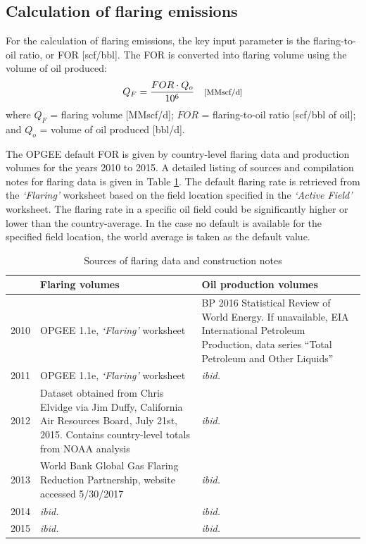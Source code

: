 \documentclass[11pt]{report}
\newcommand{\marg}[1]{{\footnotesize\textit{\textcolor{stanford}{'#1'}}}}
\newcommand{\marginnote}[1]{\marginpar{\marg{#1}}}
\newcommand{\sheet}[1]{\textit{`{#1}'}}
\begin{document}
\subsection{Calculation of flaring emissions} \label{sec:flaring_emissions}


For the calculation of flaring emissions, the key input parameter is the flaring-to-oil ratio, or FOR [scf/bbl]. The FOR is converted into flaring volume using the volume of oil produced: \marginnote{Flaring \\ 1.3}
\begin{equation} \label{eq:flaring_volume}
Q_{F}= \frac{FOR \cdot Q_{o}}{10^6} \quad \footnotesize{\text{[MMscf/d]}}
\end{equation}
where $Q_{F}$ = flaring volume [MMscf/d]; $FOR$ = flaring-to-oil ratio [scf/bbl of oil]; and $Q_{o}$ = volume of oil produced [bbl/d].

The OPGEE default FOR is given by country-level flaring data \cite{NOAA2010} and production volumes \cite{EIA2010} for the years 2010 to 2015. \marginnote{Flaring \\ Table 4.1}  A detailed listing of sources and compilation notes for flaring data is given in Table \ref{tab:flaringdata}. The default flaring rate is retrieved from the \sheet{Flaring} worksheet based on the field location specified in the \sheet{Active Field} worksheet. The flaring rate in a specific oil field could be significantly higher or lower than the country-average. In the case no default is available for the specified field location, the world average is taken as the default value.

\begin{table}
\begin{scriptsize}
\caption{Sources of flaring data and construction notes}
\label{tab:flaringdata}
\begin{tabular*}{1\columnwidth}{p{}p{}p{}}
\toprule
	 & Flaring volumes & Oil production volumes \\
\midrule
2010 & OPGEE 1.1e, \sheet{Flaring} worksheet & BP 2016 Statistical Review of World Energy. If unavailable, EIA International Petroleum Production, data series ``Total Petroleum and Other Liquids'' \\
2011 & OPGEE 1.1e, \sheet{Flaring} worksheet & \emph{ibid.} \\
2012 & Dataset obtained from Chris Elvidge via Jim Duffy, California Air Resources Board, July 21st, 2015. Contains country-level totals from NOAA analysis & \emph{ibid.} \\
2013 & World Bank Global Gas Flaring Reduction Partnership, website accessed 5/30/2017 & \emph{ibid.} \\
2014 & \emph{ibid.} &\emph{ibid.} \\
2015 & \emph{ibid.} &\emph{ibid.} \\
\bottomrule
\end{tabular*}
\end{scriptsize}
\end{table}
\end{document}
